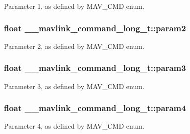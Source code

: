 Parameter 1, as defined by M\+A\+V\+\_\+\+C\+M\+D enum. 

\hypertarget{struct____mavlink__command__long__t_a715bfae8c34e8882b82efbb2bd0e580c}{
\subsubsection[{param2}]{\setlength{\rightskip}{0pt plus 5cm}float \+\_\+\+\_\+mavlink\+\_\+command\+\_\+long\+\_\+t\+::param2}}\label{struct____mavlink__command__long__t_a715bfae8c34e8882b82efbb2bd0e580c}


Parameter 2, as defined by M\+A\+V\+\_\+\+C\+M\+D enum. 

\hypertarget{struct____mavlink__command__long__t_a9b11618cd6d409944727cfcc0d637f72}{
\subsubsection[{param3}]{\setlength{\rightskip}{0pt plus 5cm}float \+\_\+\+\_\+mavlink\+\_\+command\+\_\+long\+\_\+t\+::param3}}\label{struct____mavlink__command__long__t_a9b11618cd6d409944727cfcc0d637f72}


Parameter 3, as defined by M\+A\+V\+\_\+\+C\+M\+D enum. 

\hypertarget{struct____mavlink__command__long__t_a1448f543670b7a8973c6461254cce429}{
\subsubsection[{param4}]{\setlength{\rightskip}{0pt plus 5cm}float \+\_\+\+\_\+mavlink\+\_\+command\+\_\+long\+\_\+t\+::param4}}\label{struct____mavlink__command__long__t_a1448f543670b7a8973c6461254cce429}


Parameter 4, as defined by M\+A\+V\+\_\+\+C\+M\+D enum. 

